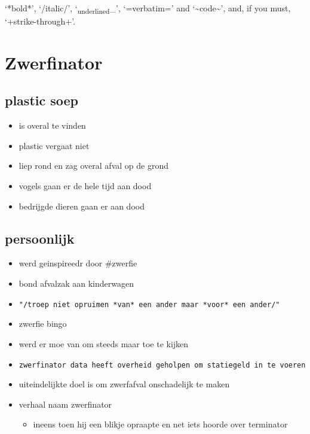 \documentclass[11pt]{article}
\date{\today}
\title{}
\begin{document}
\tableofcontents

‘*bold*’, ‘/italic/’, ‘\textsubscript{underlined}\_’, ‘=verbatim=’ and ‘\textasciitilde{}code\textasciitilde{}’, and, if you must, ‘+strike-through+’.

\section{Zwerfinator}
\label{sec:org31305ba}
\subsection{plastic soep}
\label{sec:org8f571f9}
\begin{itemize}
\item is overal te vinden
\item plastic vergaat niet
\item liep rond en zag overal afval op de grond
\item vogels gaan er de hele tijd aan dood
\item bedrijgde dieren gaan er aan dood
\end{itemize}
\subsection{persoonlijk}
\label{sec:org668c16b}
\begin{itemize}
\item werd geinspireedr door \#zwerfie
\item bond afvalzak aan kinderwagen
\item \texttt{"/troep niet opruimen *van* een ander maar *voor* een ander/"}
\item zwerfie bingo
\item werd er moe van om steeds maar toe te kijken
\item \texttt{zwerfinator data heeft overheid geholpen om statiegeld in te voeren}
\item uiteindelijkte doel is om zwerfafval onschadelijk te maken
\item verhaal naam zwerfinator
\begin{itemize}
\item ineens toen hij een blikje opraapte en net iets hoorde over terminator
\end{itemize}
\end{itemize}
\end{document}
